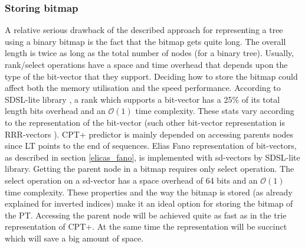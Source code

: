 \subsubsection*{Storing bitmap}
A relative serious drawback of the described approach for representing a tree using a binary bitmap is the fact that the bitmap gets quite long. The overall length is twice as long as the total number of nodes (for a binary tree). Usually, rank/select operations have a space and time overhead that depends upon the type of the bit-vector that they support. Deciding how to store the bitmap could affect both the memory utilisation and the speed performance. According to SDSL-lite library \cite{gog_2015}, a rank which supports a bit-vector has a 25\% of its total length bits overhead and an \(\mathcal{O}(1)\) time complexity. These stats vary according to the representation of the bit-vector (such other bit-vector representation is RRR-vectors \cite{Raman}). CPT+ predictor is mainly depended on accessing parents nodes since LT points to the end of sequences. Elias Fano representation of bit-vectors, as described in section \ref{elicas_fano}, is implemented with sd-vectors by SDSL-lite library. Getting the parent node in a bitmap requires only select operation. The select operation on a sd-vector has a space overhead of 64 bits and an \(\mathcal{O}(1)\) time complexity. These properties and the way the bitmap is stored (as already explained for inverted indices) make it an ideal option for storing the bitmap of the PT. Accessing the parent node will be achieved quite as fast as in the trie representation of CPT+. At the same time the representation will be succinct which will save a big amount of space. 

 
